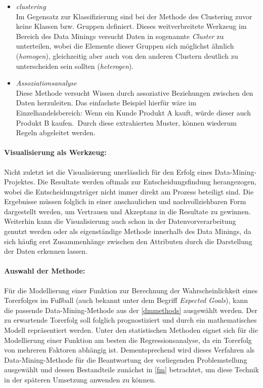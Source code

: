\begin{itemize}
\item \textit{\gls{clustering}}
\\ Im Gegensatz zur Klassifizierung sind bei der Methode des Clustering zuvor keine Klassen bzw. Gruppen definiert. Dieses weitverbreitete Werkzeug im Bereich des Data Minings versucht Daten in sogenannte \textit{Cluster} zu unterteilen, wobei die Elemente dieser Gruppen sich möglichst ähnlich (\textit{homogen}), gleichzeitig aber auch von den anderen Clustern deutlich zu unterscheiden sein sollten (\textit{heterogen}).
\enlargethispage{\baselineskip} 
\item \textit{Assoziationsanalyse}
\\ Diese Methode versucht Wissen durch assoziative Beziehungen zwischen den Daten herzuleiten. Das einfachste Beispiel hierfür wäre im Einzelhandelsbereich: \glqq Wenn ein Kunde Produkt A kauft, würde dieser auch Produkt B kaufen.\grqq~Durch diese extrahierten Muster, können wiederum Regeln abgeleitet werden.
\end{itemize}


\paragraph{Visualisierung als Werkzeug:}
Nicht zuletzt ist die Visualisierung unerlässlich für den Erfolg eines Data-Mining-Projektes. Die Resultate werden oftmals zur Entscheidungsfindung herangezogen, wobei die Entscheidungsträger nicht immer direkt am Prozess beteiligt sind. Die Ergebnisse müssen folglich in einer anschaulichen und nachvollziehbaren Form dargestellt werden, um Vertrauen und Akzeptanz in die Resultate zu gewinnen. Weiterhin kann die Visualisierung auch schon in der Datenvorverarbeitung genutzt werden oder als eigenständige Methode innerhalb des Data Minings, da sich häufig erst Zusammenhänge zwischen den Attributen durch die Darstellung der Daten erkennen lassen.

\paragraph{Auswahl der Methode:}
Für die Modellierung einer Funktion zur Berechnung der Wahrscheinlichkeit eines Torerfolges im Fußball (auch bekannt unter dem Begriff \textit{Expected Goals}), kann die passende Data-Mining-Methode aus der \vref{dmmethods} ausgewählt werden. Der zu erwartende Torerfolg soll folglich prognostiziert und durch ein mathematisches Modell repräsentiert werden. Unter den statistischen Methoden eignet sich für die Modellierung einer Funktion am besten die Regressionsanalyse, da ein Torerfolg von mehreren Faktoren abhängig ist. Dementsprechend wird dieses Verfahren als Data-Mining-Methode für die Beantwortung der vorliegenden Problemstellung ausgewählt und dessen Bestandteile zunächst in \vref{fm} betrachtet, um diese Technik in der späteren Umsetzung anwenden zu können.	


